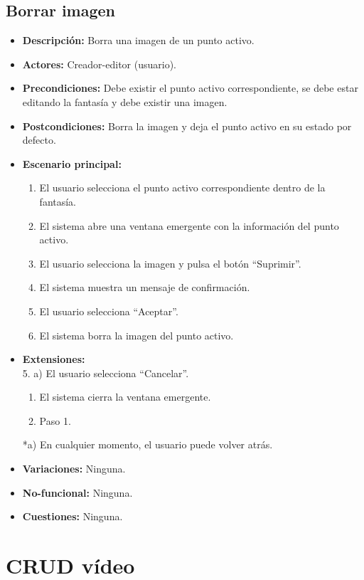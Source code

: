 \subsection{Borrar imagen}
\begin{itemize}
	\item \textbf{Descripción:} Borra una imagen de un punto activo.
	\item \textbf{Actores:} Creador-editor (usuario).
	\item \textbf{Precondiciones:} Debe existir el punto activo correspondiente, se debe estar editando la fantasía y debe existir una imagen.
	\item \textbf{Postcondiciones:} Borra la imagen y deja el punto activo en su estado por defecto.
	\item \textbf{Escenario principal:}
	\begin{enumerate}
		\item El usuario selecciona el punto activo correspondiente dentro de la fantasía.
		\item El sistema abre una ventana emergente con la información del punto activo.
		\item El usuario selecciona la imagen y pulsa el botón ``Suprimir''.
		\item El sistema muestra un mensaje de confirmación.
		\item El usuario selecciona ``Aceptar''.
		\item El sistema borra la imagen del punto activo.
	\end{enumerate}
	\item \textbf{Extensiones:} \\ 5. a) El usuario selecciona ``Cancelar''.
	\begin{enumerate}
		\item El sistema cierra la ventana emergente.
		\item Paso 1.
	\end{enumerate}
	*a) En cualquier momento, el usuario puede volver atrás.
	\item \textbf{Variaciones:} Ninguna.
	\item \textbf{No-funcional:} Ninguna.
	\item \textbf{Cuestiones:} Ninguna.
\end{itemize}

\section{CRUD vídeo}
\hypertarget{crearvideo}{}
